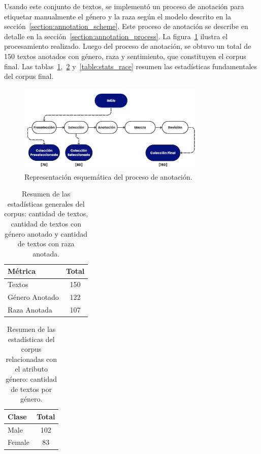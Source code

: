 Usando este conjunto de textos, se implement\'o un proceso de anotaci\'on para etiquetar manualmente el g\'enero y la raza seg\'un 
el modelo descrito en la secci\'on~\ref{section:annotation_scheme}. Este proceso de anotaci\'on se describe en detalle en la 
secci\'on~\ref{section:annotation_process}. La figura~\ref{fig:ann_proc} ilustra el procesamiento realizado.
Luego del proceso de anotaci\'on, se obtuvo un total de 150 textos anotados con g\'enero, raza y sentimiento, que constituyen el 
corpus final. Las tablas~\ref{table:stats},~\ref{table:stats_gen} y~\ref{table:stats_race}  resumen las estad\'isticas fundamentales 
del corpus final.

\begin{figure}[htpb]
    \begin{center}
        \includegraphics[width=0.8\textwidth]{Graphics/annotation_proc.png}
    \end{center}
    \caption{Representaci\'on esquem\'atica del proceso de anotaci\'on.}
    \label{fig:ann_proc}
\end{figure}

\begin{table}[htpb]
    \centering
        \begin{tabular}{lc}
        \toprule
        \textbf{M\'etrica} & \textbf{Total} \\
        \midrule
                    Textos & 150 \\
          G\'enero Anotado & 122 \\
              Raza Anotada & 107 \\

        \bottomrule
        \end{tabular}
    \caption{Resumen de las estad\'isticas generales del corpus: cantidad de textos, cantidad de textos con g\'enero anotado y 
    cantidad de textos con raza anotada.}
    \label{table:stats}
\end{table}

\begin{table}[htpb]
    \centering
        \begin{tabular}{lc}
        \toprule
          \textbf{Clase} & \textbf{Total} \\
        \midrule
                    Male & 102 \\
                  Female & 83 \\

        \bottomrule
        \end{tabular}
    \caption{Resumen de las estad\'isticas del corpus relacionadas con el atributo g\'enero: cantidad de textos por g\'enero.}
    \label{table:stats_gen}
\end{table}

